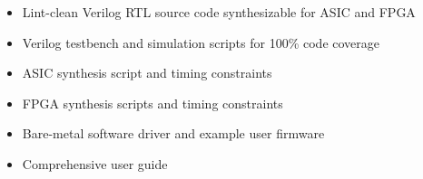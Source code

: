 %

\begin{itemize}
  \itemsep-0.5em
\item Lint-clean Verilog RTL source code synthesizable for ASIC and FPGA
\item Verilog testbench and simulation scripts for 100\% code coverage
\item ASIC synthesis script and timing constraints
\item FPGA synthesis scripts and timing constraints
\item Bare-metal software driver and example user firmware
\item Comprehensive user guide
\end{itemize}
